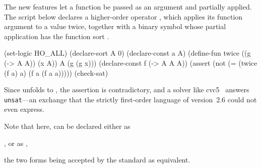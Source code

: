\begin{example}
The new features let a function be passed as an argument and partially applied.
The script below declares a higher-order operator , which applies
its function argument to a value twice, together with a binary symbol
 whose partial application  has the function sort
.
\begin{smtlisting}
(set-logic HO_ALL)
(declare-sort A 0)
(declare-const a A)
(define-fun twice ((g (-> A A)) (x A)) A (g (g x)))
(declare-const f (-> A A A))
(assert (not (= (twice (f a) a) (f a (f a a)))))
(check-sat)
\end{smtlisting}
Since  unfolds to , the assertion
is contradictory, and a solver like cvc5~\cite{barbosa2022cvc5} answers
\texttt{unsat}---an exchange that the strictly first-order language of
version~2.6 could not even express.

Note that here,  can be declared either as
\begin{center}
  \vspace*{-.5\baselineskip}
  ,
  or as ,
  \vspace*{-.5\baselineskip}
\end{center}
the two forms being accepted by the standard as equivalent.  
\end{example}
